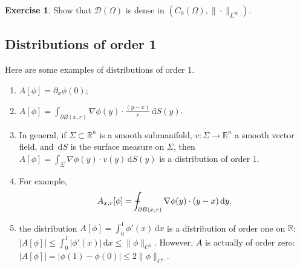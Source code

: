\documentclass[a4paper,9pt]{amsart}
\newcommand{\scr}[1]{\mathscr{#1}}
\newcommand{\R}{\mathbb{R}}	%
\newcommand{\did}{\,\mathrm{d}}	%
\newcommand{\de}{\partial}		%
\newcommand{\grad}{\nabla}
\def\Xint#1{\mathchoice
      {\XXint\displaystyle\textstyle{#1}}%
      {\XXint\textstyle\scriptstyle{#1}}%
      {\XXint\scriptstyle\scriptscriptstyle{#1}}%
      {\XXint\scriptscriptstyle\scriptscriptstyle{#1}}%
      \!\int}
\def\XXint#1#2#3{{\setbox0=\hbox{$#1{#2#3}{\int}$}
        \vcenter{\hbox{$#2#3$}}\kern-.5\wd0}}
\def\fint{\Xint-}
\theoremstyle{plain}
\theoremstyle{definition}
\newtheorem{exercise}[proposition]{Exercise}%
\theoremstyle{remark}
\begin{document}
\begin{exercise}\label{ex67df0243}
	Show that $\scr D(\Omega)$ is dense in $( C_0(\Omega),\|\cdot\|_{L^\infty})$.
\end{exercise}


\subsection{Distributions of order 1}\label{subs67df056f}
Here are some examples of distributions of order $1$.
\begin{enumerate}
\item	
$A[\phi] = \de_x\phi(0)$;
\item
$A[\phi] = \int_{\de B(x,r)} \grad\phi(y)\cdot\frac{(y-x)}{r} \did S(y)$.
\item
In general, if $\Sigma\subset\R^n$ is a smooth submanifold, $v:\Sigma\to\R^n$ a smooth vector field, and $\did S$ is the surface measure on $\Sigma$, then 
$A[\phi] = \int_\Sigma \grad\phi(y)\cdot v(y) \did S(y)$ is a distribution of order 1.
\item
For example,
\begin{equation}
	A_{x,r}[\phi] = \fint_{\de B(x,r)} \grad\phi(y) \cdot (y-x) \did y .
\end{equation}
\item 
	the distribution $A[\phi] = \int_0^1 \phi'(x)\did x$ is a distribution of order one on $\R$: $|A[\phi]| \le \int_0^1 |\phi'(x)|\did x \le \|\phi\|_{C^1} $.
	However, $A$ is actually of order zero: $|A[\phi]| = |\phi(1)-\phi(0)| \le 2\|\phi\|_{C^0}$.
\end{enumerate}


\end{document}
